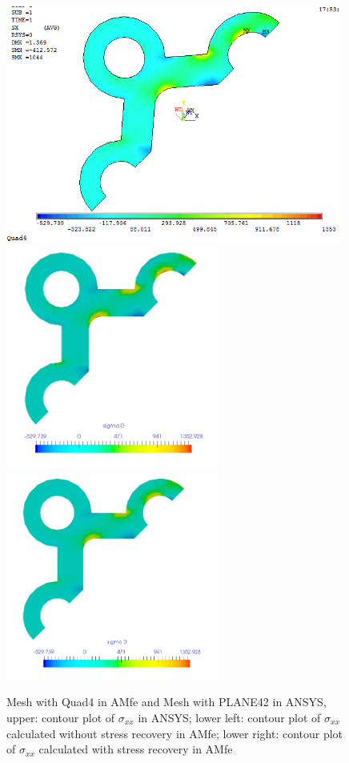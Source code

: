 \begin{figure}[htbp]
	\begin{center}
		\includegraphics[width=11cm,clip]{Quad4_Sxx.png} 
		\includegraphics[width=7cm,clip]{Quad4_Sxx_PD.png} 			
		\includegraphics[width=7cm,clip]{Quad4_Sxx_P.png} 		
		\caption{Mesh with Quad4 in AMfe and Mesh with PLANE42 in ANSYS, upper: contour plot of $\sigma_{xx}$ in ANSYS; lower left: contour plot of $\sigma_{xx}$ calculated without stress recovery in AMfe; lower right: contour plot of $\sigma_{xx}$ calculated with stress recovery in AMfe} \label{fig: Quad4_Sxx}
	\end{center}
\end{figure}
\clearpage 

